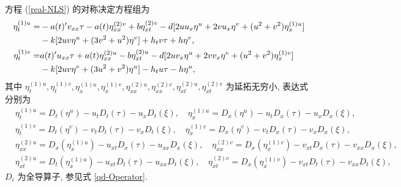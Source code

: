 方程 (\ref{real-NLS}) 的对称决定方程组为
\begin{align}
\eta^{(1)u}_t=&-a(t)'v_{xx}\tau-a(t)\eta^{(2)v}_{xx}+b\eta^{(2)v}_{xt}
-d[2uu_x\eta^u+2vu_x\eta^v+(u^2+v^2)\eta^{(1)u}_x]\notag\\
&-k[2uv\eta^u+(3v^2+u^2)\eta^v]+h_tv\tau+h\eta^v,\\
\eta^{(1)v}_t=&a(t)'u_{xx}\tau+a(t)\eta^{(2)u}_{xx}-b\eta^{(2)u}_{xt}
-d[2uv_x\eta^u+2vv_x\eta^v+(u^2+v^2)\eta^{(1)v}_x]\notag\\
&-k[2uv\eta^v+(3u^2+v^2)\eta^u]-h_tu\tau-h\eta^u,
\end{align}
其中 $\eta^{(1)u}_t, \eta^{(1)v}_t, \eta^{(1)u}_x, \eta^{(1)v}_x, \eta^{(2)u}_{xx}, \eta^{(2)v}_{xx}, \eta^{(2)u}_{xt}, \eta^{(2)v}_{xt}$ 为延拓无穷小, 表达式分别为
\begin{align*}
&\eta_t^{(1)u}=D_t(\eta^u)-u_tD_t(\tau)-u_xD_t(\xi),\quad \eta_x^{(1)u}=D_x(\eta^u)-u_tD_x(\tau)-u_xD_x(\xi),\\
&\eta_t^{(1)v}=D_t(\eta^v)-v_tD_t(\tau)-v_xD_t(\xi),\quad \eta_x^{(1)v}=D_x(\eta^v)-v_tD_x(\tau)-v_xD_x(\xi),\\
&\eta_{xx}^{(2)u}=D_x(\eta_x^{(1)u})-u_{xt}D_x(\tau)-u_{xx}D_x(\xi),\quad \eta_{xx}^{(2)v}=D_x(\eta_x^{(1)v})-v_{xt}D_x(\tau)-v_{xx}D_x(\xi),\\ &\eta_{xt}^{(2)u}=D_t(\eta_x^{(1)u})-u_{xt}D_t(\tau)-u_{xx}D_t(\xi),\quad \eta_{xt}^{(2)v}=D_x(\eta_x^{(1)v})-v_{xt}D_t(\tau)-v_{xx}D_t(\xi),
\end{align*}
$D_i$ 为全导算子, 参见式 \eqref{qd-Operator}.

